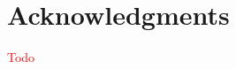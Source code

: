 \documentclass[../main.tex]{subfiles}
\begin{document}
\section*{Acknowledgments}

\textcolor{red}{Todo}
\end{document}
